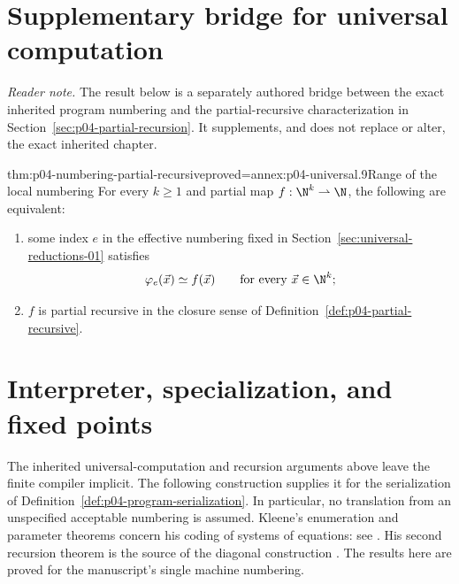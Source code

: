
\section*{Supplementary bridge for universal computation}
\noindent\textit{Reader note.}
The result below is a separately authored bridge between the exact inherited
program numbering and the partial-recursive characterization in
Section~\ref{sec:p04-partial-recursion}.  It supplements, and does not replace
or alter, the exact inherited chapter.

\begin{hbcorollary}{thm:p04-numbering-partial-recursive}{proved=annex:p04-universal.9}{Range of the local numbering}
For every \(k\geq1\) and partial map \(f:\N^k\rightharpoonup\N\), the
following are equivalent:
\begin{enumerate}
  \item some index \(e\) in the effective numbering fixed in
        Section~\ref{sec:universal-reductions-01} satisfies
        \[
          \varphi_e(\vec x)\simeq f(\vec x)
          \qquad\text{for every }\vec x\in\N^k;
        \]
  \item \(f\) is partial recursive in the closure sense of
        Definition~\ref{def:p04-partial-recursive}.
\end{enumerate}
\end{hbcorollary}

\section{Interpreter, specialization, and fixed points}
\label{sec:p04-local-program-completion}

The inherited universal-computation and recursion arguments above leave the
finite compiler implicit.  The following construction supplies it for the
serialization of Definition~\ref{def:p04-program-serialization}.  In
particular, no translation from an unspecified acceptable numbering is
assumed.  Kleene's enumeration and parameter theorems concern his coding of
systems of equations: see \cite[\S65, Theorems XXII--XXIII, pp.~340--342]{Kleene1952}.
His second recursion theorem is the source of the diagonal construction
\cite[\S66, Theorem XXVII, pp.~352--353]{Kleene1952}.  The results here are
proved for the manuscript's single machine numbering.

